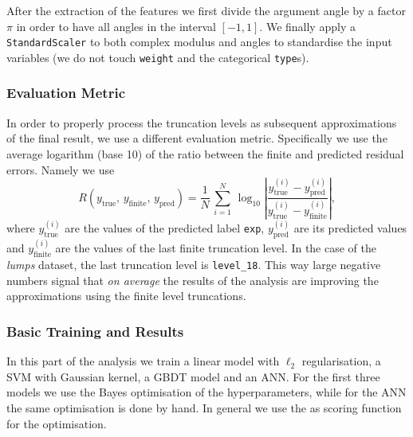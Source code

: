 After the extraction of the features we first divide the argument angle by a factor $\pi$ in order to have all angles in the interval $[ -1, 1 ]$.
We finally apply a \texttt{StandardScaler} to both complex modulus and angles to standardise the input variables (we do not touch \texttt{weight} and the categorical \texttt{type}s).


\subsubsection{Evaluation Metric}

In order to properly process the truncation levels as subsequent approximations of the final result, we use a different evaluation metric.
Specifically we use the average logarithm (base \num{10}) of the ratio between the finite and predicted residual errors.
Namely we use
\begin{equation}
  R( y_{\text{true}},\, y_{\text{finite}},\, y_{\text{pred}} )
  =
  \frac{1}{N}\,
  \sum\limits_{i = 1}^N\,
  \log_{10}\left| \frac{y_{\text{true}}^{(i)} - y_{\text{pred}}^{(i)}}{y_{\text{true}}^{(i)} - y_{\text{finite}}^{(i)}} \right|,
\end{equation}
where $y_{\text{true}}^{(i)}$ are the values of the predicted label \texttt{exp}, $y_{\text{pred}}^{(i)}$ are its predicted values and $y_{\text{finite}}^{(i)}$ are the values of the last finite truncation level.
In the case of the \emph{lumps} dataset, the last truncation level is \texttt{level\_18}.\footnotemark{}
This way large negative numbers signal that \emph{on average} the results of the \ml analysis are improving the approximations using the finite level truncations.


\subsubsection{Basic Training and Results}

In this part of the analysis we train a linear model with $\ell_2$ regularisation, a SVM with Gaussian kernel, a GBDT model and an ANN.
For the first three models we use the Bayes optimisation of the hyperparameters, while for the ANN the same optimisation is done by hand.
In general we use the \mse as scoring function for the optimisation.

